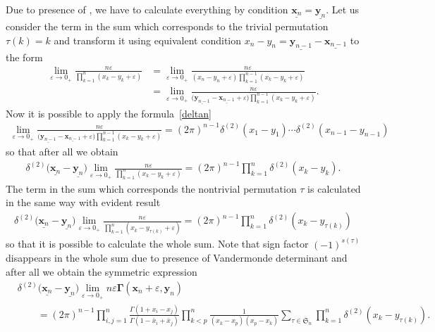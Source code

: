\documentclass[pdftex]{sigma}
\numberwithin{equation}{section}
\begin{document}
Due to presence of , we have to
calculate everything by condition $\underline{\bm{x}_n}=\underline{\bm{y}_n}$.
Let us consider the term in the sum which corresponds to the trivial permutation $\tau(k) = k$ and transform it using equivalent condition
$x_n-y_n = \underline{\bm{y}_{n-1}}-\underline{\bm{x}_{n-1}}$ to the form
\begin{align*}
\lim_{\varepsilon\to 0_+}
\frac{n \varepsilon}{\prod_{k=1}^{n}(x_k-y_{k}+\varepsilon)} & =
\lim_{\varepsilon\to 0_+}
\frac{n \varepsilon}{(x_n-y_{n}+\varepsilon)
\prod_{k=1}^{n-1}(x_k-y_k+\varepsilon)} \\
& =
\lim_{\varepsilon\to 0_+}
\frac{n \varepsilon}
{\bigl(\underline{\bm{y}_{n-1}}-\underline{\bm{x}_{n-1}}+\varepsilon\bigr)
\prod_{k=1}^{n-1}(x_k-y_k+\varepsilon)} .
\end{align*}
Now it is possible to apply the formula~\eqref{deltan}
\begin{align*}
\lim\limits_{\varepsilon\to 0_+}
\frac{n \varepsilon}
{\bigl(\underline{\bm{y}_{n-1}}-\underline{\bm{x}_{n-1}}+\varepsilon\bigr)
\prod_{k=1}^{n-1}(x_k-y_k+\varepsilon)} =
(2\pi)^{n-1} \delta^{(2)}(x_1-y_1) \cdots \delta^{(2)}(x_{n-1}-y_{n-1})
\end{align*}
so that after all we obtain
\begin{align*}
\delta^{(2)}\bigl(\underline{\bm{x}_n}-\underline{\bm{y}_n}\bigr)
\lim\limits_{\varepsilon\to 0_+}
\frac{n \varepsilon}
{\prod_{k=1}^{n}(x_k-y_k+\varepsilon)} =
(2\pi)^{n-1} \prod_{k=1}^{n}
\delta^{(2)}(x_k-y_k) .
\end{align*}
The term in the sum which corresponds the nontrivial
permutation $\tau$ is calculated in the same way with evident result
\begin{align*}
\delta^{(2)}\bigl(\underline{\bm{x}_n}-\underline{\bm{y}_n}\bigr)
\lim\limits_{\varepsilon\to 0_+}
\frac{n \varepsilon}
{\prod_{k=1}^{n}(x_k-y_{\tau(k)}+\varepsilon)} =
(2\pi)^{n-1} \prod_{k=1}^{n}
\delta^{(2)}(x_k-y_{\tau(k)})
\end{align*}
so that it is possible to calculate the whole sum.
Note that sign factor $(-1)^{s(\tau)}$ disappears in the whole sum
due to presence of Vandermonde determinant
 and after all we obtain the
symmetric expression
\begin{align*}
&
\delta^{(2)}\bigl(\underline{\bm{x}_n}-\underline{\bm{y}_n}\bigr)
\lim_{\varepsilon\to 0_+}
n \varepsilon \mathbf{\Gamma}(\bm{x}_n+\varepsilon, \bm{y}_n) \\
& \qquad =
(2\pi)^{n-1} \prod\limits_{i,j=1}^n
\frac{\Gamma(1+x_i-x_j)}{\Gamma(1 -\bar{x}_i+\bar{x}_j)}
\prod\limits_{k<p}^n \frac{1}
{(x_{k}-x_{p}) (x_{p}-x_{k})}
\sum_{\tau\in \mathfrak{S}_{n}} \prod_{k=1}^{n}
\delta^{(2)}(x_k-y_{\tau(k)}) .
\end{align*}
\end{document}
